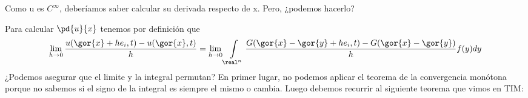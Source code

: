 






		Como u es $C^\infty$, deberíamos saber calcular su derivada respecto de x. Pero, ¿podemos hacerlo?

		Para calcular $\pd{u}{x}$ tenemos por definición que
		\[ \lim_{h \to 0} \frac{u(\gor{x} + h e_i,t)-u(\gor{x},t)}{h} = \lim_{h \to 0} \int\limits_{\real^n} \frac{G(\gor{x}-\gor{y}+he_i,t)-G(\gor{x}-\gor{y})}{h} f(y) dy \]
		¿Podemos asegurar que el limite y la integral permutan? En primer lugar, no podemos aplicar el teorema de la convergencia monótona porque no sabemos si el signo de la integral es siempre el mismo o cambia. Luego debemos recurrir al siguiente teorema que vimos en TIM:

